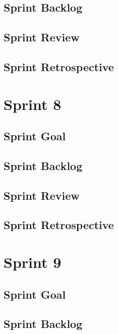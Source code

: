 \documentclass{report}
\begin{document}
    \section{Sprint Backlog}
        
    \section{Sprint Review}
        
    \section{Sprint Retrospective}
        
        
    \chapter{Sprint 8}
    \section{Sprint Goal}
        
    \section{Sprint Backlog}
        
    \section{Sprint Review}
        
    \section{Sprint Retrospective}
        
        
    \chapter{Sprint 9}
    \section{Sprint Goal}
        
    \section{Sprint Backlog}
        
\end{document}
